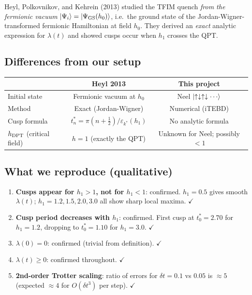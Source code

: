 \documentclass[11pt, a4paper]{article}
\begin{document}
Heyl, Polkovnikov, and Kehrein (2013) studied the TFIM quench \emph{from the fermionic vacuum} $\ket{\Psi_i} = \ket{\Psi_{\rm GS}(h_0)}$, i.e.\ the ground state of the Jordan-Wigner-transformed fermionic Hamiltonian at field $h_0$. They derived an \emph{exact} analytic expression for $\lambda(t)$ and showed cusps occur when $h_1$ crosses the QPT.

\subsection{Differences from our setup}

\begin{center}
\begin{tabular}{lcc}
\toprule
& Heyl 2013 & This project \\
\midrule
Initial state & Fermionic vacuum at $h_0$ & Neel $\ket{\uparrow\downarrow\uparrow\downarrow\cdots}$ \\
Method & Exact (Jordan-Wigner) & Numerical (iTEBD) \\
Cusp formula & $t^*_n = \pi(n+\tfrac{1}{2})/\varepsilon_{k^*}(h_1)$ & No analytic formula \\
$h_{\rm DPT}$ (critical field) & $h = 1$ (exactly the QPT) & Unknown for Neel; possibly $< 1$ \\
\bottomrule
\end{tabular}
\end{center}

\subsection{What we reproduce (qualitative)}

\begin{enumerate}
  \item \textbf{Cusps appear for $h_1 > 1$, not for $h_1 < 1$}: confirmed. $h_1 = 0.5$ gives smooth $\lambda(t)$; $h_1 = 1.2, 1.5, 2.0, 3.0$ all show sharp local maxima. $\checkmark$
  \item \textbf{Cusp period decreases with $h_1$}: confirmed. First cusp at $t^*_0 = 2.70$ for $h_1 = 1.2$, dropping to $t^*_0 = 1.10$ for $h_1 = 3.0$. $\checkmark$
  \item \textbf{$\lambda(0) = 0$}: confirmed (trivial from definition). $\checkmark$
  \item \textbf{$\lambda(t) \geq 0$}: confirmed throughout. $\checkmark$
  \item \textbf{2nd-order Trotter scaling}: ratio of errors for $\delta t = 0.1$ vs $0.05$ is $\approx 5$ (expected $\approx 4$ for $O(\delta t^3)$ per step). $\checkmark$
\end{enumerate}
\end{document}
